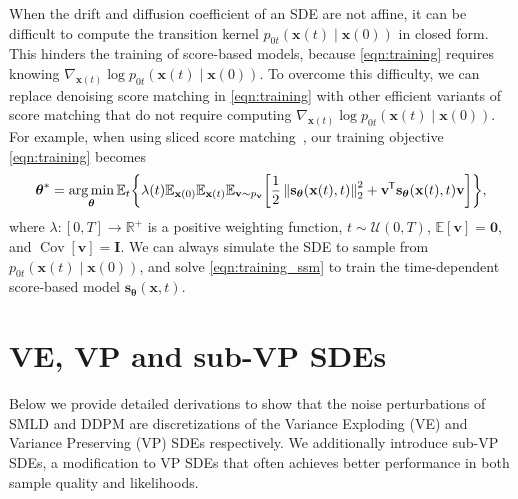 \documentclass{article} \usepackage{iclr2021_conference,times}
\newcommand*{\tran}{^{\mkern-1.5mu\mathsf{T}}}
\newcommand{\mbb}[1]{\mathbb{#1}}
\newcommand{\mcal}{\mathcal}
\newcommand{\norm}[1]{\left\lVert#1\right\rVert}
\DeclareMathOperator*{\argmin}{arg\,min}
\newcommand{\bfx}{\mathbf{x}}
\newcommand{\bfv}{\mathbf{v}}
\newcommand{\bfI}{\mathbf{I}}
\newcommand{\bfzero}{\mathbf{0}}
\newcommand{\bftheta}{{\boldsymbol{\theta}}}
\newcommand{\bfs}{\mathbf{s}}
\begin{document}
When the drift and diffusion coefficient of an SDE are not affine, it can be difficult to compute the transition kernel $p_{0t}(\bfx(t) \mid \bfx(0))$ in closed form. This hinders the training of score-based models, because \cref{eqn:training} requires knowing $\nabla_{\bfx(t)}\log p_{0t}(\bfx(t) \mid \bfx(0))$. To overcome this difficulty, we can replace denoising score matching in \cref{eqn:training} with other efficient variants of score matching that do not require computing $\nabla_{\bfx(t)}\log p_{0t}(\bfx(t) \mid \bfx(0))$. For example, when using sliced score matching~\citep{song2019sliced}, our training objective \cref{eqn:training} becomes
\begin{align}
   \bftheta^* = \argmin_\bftheta 
   \mbb{E}_{t}\bigg\{\lambda(t) \mbb{E}_{\bfx(0)}\mbb{E}_{\bfx(t) }\mbb{E}_{\bfv \sim p_\bfv}
   \bigg[\frac{1}{2}\norm{\bfs_\bftheta(\bfx(t), t)}_2^2 + \bfv\tran \bfs_\bftheta(\bfx(t), t) \bfv \bigg]\bigg\}, \label{eqn:training_ssm}
\end{align}
where $\lambda: [0,T] \to \mbb{R}^+$ is a positive weighting function, $t \sim \mcal{U}(0, T)$, $\mbb{E}[\bfv] = \bfzero$, and $\operatorname{Cov}[\bfv] = \bfI$. We can always simulate the SDE to sample from $p_{0t}(\bfx(t) \mid \bfx(0))$, and solve \cref{eqn:training_ssm} to train the time-dependent score-based model $\bfs_\bftheta(\bfx, t)$.




\section{VE, VP and sub-VP SDEs}\label{app:sde_derive}
Below we provide detailed derivations to show that the noise perturbations of SMLD and DDPM are discretizations of the Variance Exploding (VE) and Variance Preserving (VP) SDEs respectively. We additionally introduce sub-VP SDEs, a modification to VP SDEs that often achieves better performance in both sample quality and likelihoods.
\end{document}
